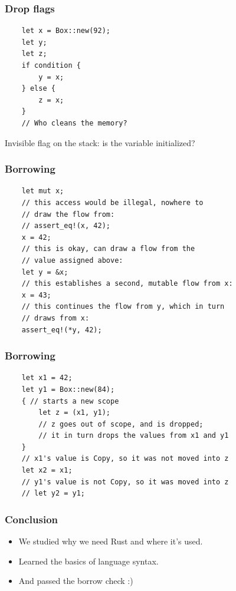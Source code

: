 \documentclass[aspectratio=1610,t]{beamer}
\begin{document}

\begin{frame}[fragile]
\frametitle{Drop flags}
\begin{verbatim}
    let x = Box::new(92);
    let y;
    let z;
    if condition {
        y = x;
    } else {
        z = x;
    }
    // Who cleans the memory?
\end{verbatim}

Invisible flag on the stack: is the variable initialized?
\end{frame}


\begin{frame}[fragile]
\frametitle{Borrowing}
\begin{verbatim}
    let mut x;
    // this access would be illegal, nowhere to
    // draw the flow from:
    // assert_eq!(x, 42);
    x = 42;
    // this is okay, can draw a flow from the
    // value assigned above:
    let y = &x;
    // this establishes a second, mutable flow from x:
    x = 43;
    // this continues the flow from y, which in turn
    // draws from x:
    assert_eq!(*y, 42);
\end{verbatim}
\end{frame}


\begin{frame}[fragile]
\frametitle{Borrowing}
\begin{verbatim}
    let x1 = 42;
    let y1 = Box::new(84);
    { // starts a new scope
        let z = (x1, y1);
        // z goes out of scope, and is dropped;
        // it in turn drops the values from x1 and y1
    }
    // x1's value is Copy, so it was not moved into z
    let x2 = x1;
    // y1's value is not Copy, so it was moved into z
    // let y2 = y1;
\end{verbatim}
\end{frame}


\begin{frame}[fragile]
\frametitle{Conclusion}
\begin{itemize}
    \item We studied why we need Rust and where it's used.
    \item Learned the basics of language syntax.
    \item And passed the borrow check :)
\end{itemize}
\end{frame}

\end{document}
